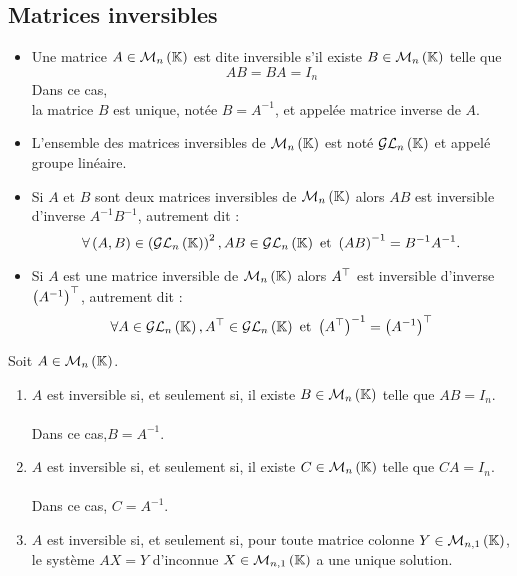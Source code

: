 \subsection{Matrices inversibles}
\begin{defprop}
    \begin{itemize}
        \item Une matrice \(A \in \mathcal{M}_n\left(\mathbb{K}\right)\) est dite inversible s’il existe \(B \in \mathcal{M}_n\left(\mathbb{K}\right)\) telle que
            \[AB = BA = I_n\]
        Dans ce cas, \\
        la matrice \(B\) est unique, notée \(B = A^{-1}\), et appelée matrice inverse de \(A\).
        \item L’ensemble des matrices inversibles de \(\mathcal{M}_n\left(\mathbb{K}\right)\) est noté \(\mathcal{GL}_n\left(\mathbb{K}\right)\) et appelé groupe linéaire.
    \end{itemize}
\end{defprop}
\begin{prop}
\begin{itemize}
    \item Si \(A\) et \(B\) sont deux matrices inversibles de \(\mathcal{M}_n\left(\mathbb{K}\right)\) alors \(AB\) est inversible d’inverse \(A^{-1}B^{-1}\), autrement dit :
    \[\forall \left(A, B\right) \in \left(\mathcal{GL}_n\left(\mathbb{K}\right)\right)^2 , AB \in \mathcal{GL}_n\left(\mathbb{K}\right)\text{ et } \left(AB\right)^{-1} = B^{-1}A^{-1}.\]
    \item Si \(A\) est une matrice inversible de \(\mathcal{M}_n\left(\mathbb{K}\right)\) alors \(A^{\top}\) est inversible d’inverse \(\left(A^{-1}\right)^{\top}\), autrement dit :
    \[\forall A \in \mathcal{GL}_n\left(\mathbb{K}\right), A^{\top} \in \mathcal{GL}_n\left(\mathbb{K}\right) \text{ et } \left(A^{\top}\right)^{-1} = \left(A^{-1}\right)^{\top}\]
\end{itemize}
\end{prop}

\begin{defprop}
    Soit \(A \in \mathcal{M}_n\left(\mathbb{K}\right)\).
    \begin{enumerate}
        \item \(A\) est inversible si, et seulement si, il existe \(B \in  \mathcal{M}_n\left(\mathbb{K}\right)\) telle que \(AB = I_n\).\\~\\
        Dans ce cas,\( B = A^{-1}\).
        \item \(A\) est inversible si, et seulement si, il existe \(C \in  \mathcal{M}_n\left(\mathbb{K}\right)\) telle que \(CA = I_n\).\\~\\
        Dans ce cas, \(C = A^{-1}\).
        \item \(A\) est inversible si, et seulement si, pour toute matrice colonne \(Y \in  \mathcal{M}_{n,1}\left(\mathbb{K}\right)\), le système \(AX = Y \) d’inconnue \(X \in \mathcal{M}_{n,1}\left(\mathbb{K}\right)\) a une unique solution.
    \end{enumerate}
\end{defprop}

